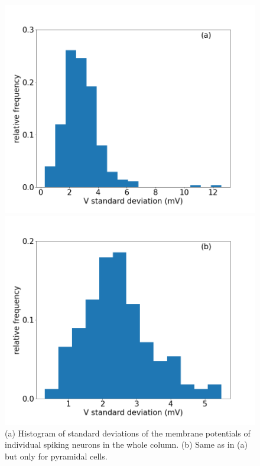 \begin{figure}[H]
    \centering
    \begin{minipage}[b]{0.45\textwidth}
    \includegraphics[scale=0.23]{Vstdall2.png}
    \end{minipage}
    \hfill
    \begin{minipage}[b]{0.5\textwidth}
        \includegraphics[scale=0.23]{VstdPC2.png}
    \end{minipage}
    \caption{(a) Histogram of standard deviations of the membrane potentials of individual spiking neurons in the whole column. (b) Same as in (a) but only for pyramidal cells.}
    \label{fig:Vstd}
\end{figure}

